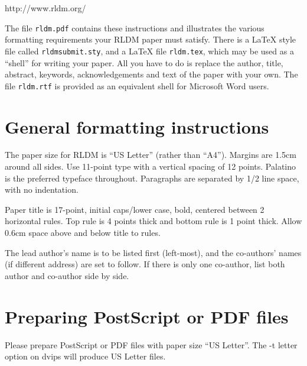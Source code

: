 \documentclass[11pt]{article}
\begin{document}
\begin{center}
   http://www.rldm.org/
\end{center}

The file \texttt{rldm.pdf} contains these instructions and illustrates
the various formatting requirements your RLDM paper must satisfy. There
is a \LaTeX{} style file called \texttt{rldmsubmit.sty}, and a \LaTeX{}
file \texttt{rldm.tex}, which may be used as a ``shell'' for writing
your paper. All you have to do is replace the author, title, abstract,
keywords, acknowledgements and text of the paper with your own. The file
\texttt{rldm.rtf} is provided as an equivalent shell for Microsoft Word
users.

\section{General formatting
instructions}\label{general-formatting-instructions}

The paper size for RLDM is ``US Letter'' (rather than ``A4''). Margins
are 1.5cm around all sides. Use 11-point type with a vertical spacing of
12 points. Palatino is the preferred typeface throughout. Paragraphs are
separated by 1/2 line space, with no indentation.

Paper title is 17-point, initial caps/lower case, bold, centered between
2 horizontal rules. Top rule is 4 points thick and bottom rule is 1
point thick. Allow 0.6cm space above and below title to rules.

The lead author's name is to be listed first (left-most), and the
co-authors' names (if different address) are set to follow. If there is
only one co-author, list both author and co-author side by side.

\section{Preparing PostScript or PDF
files}\label{preparing-postscript-or-pdf-files}

Please prepare PostScript or PDF files with paper size ``US Letter''.
The -t letter option on dvips will produce US Letter files.
\end{document}
